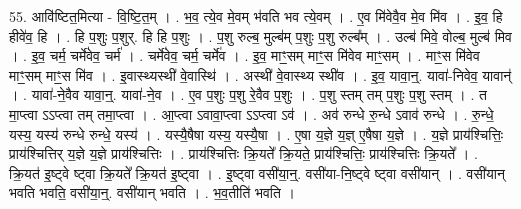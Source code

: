 \documentclass[17pt]{extarticle}
\begin{document}
55. आवि॑ष्टित॒मित्या - वि॒ष्टि॒त॒म् । . भ॒व॒ त्ये॒व मे॒वम् भ॑वति भव त्ये॒वम् । . ए॒व मि॑वेवै॒व मे॒व मि॑व । . इ॒व॒ हि हीवे॑व॒ हि । . हि प॒शुः प॒शुर्. हि हि प॒शुः । . प॒शु रुल्ब॒ मुल्ब॑म् प॒शुः प॒शु रुल्ब᳚म् । . उल्ब॑ मिवे॒ वोल्ब॒ मुल्ब॑ मिव । . इ॒व॒ चर्म॒ चर्मे॑वेव॒ चर्म॑ । . चर्मे॑वेव॒ चर्म॒ चर्मे॑व । . इ॒व॒ माꣳ॒॒सम् माꣳ॒॒स मि॑वेव माꣳ॒॒सम् । . माꣳ॒॒स मि॑वेव माꣳ॒॒सम् माꣳ॒॒स मि॑व । . इ॒वास्थ्यस्थी॑ वे॒वास्थि॑ । . अस्थी॑ वे॒वास्थ्य स्थी॑व । . इ॒व॒ यावा॒न्॒. यावा॑-निवेव॒ यावान्॑ । . यावा॑-ने॒वैव यावा॒न्॒. यावा॑-ने॒व । . ए॒व प॒शुः प॒शु रे॒वैव प॒शुः । . प॒शु स्तम् तम् प॒शुः प॒शु स्तम् । . त मा॒प्त्वा ऽऽप्त्वा तम् तमा॒प्त्वा । . आ॒प्त्वा ऽवावा॒प्त्वा ऽऽप्त्वा ऽव॑ । . अव॑ रुन्धे रु॒न्धे ऽवाव॑ रुन्धे । . रु॒न्धे॒ यस्य॒ यस्य॑ रुन्धे रुन्धे॒ यस्य॑ । . यस्यै॒षैषा यस्य॒ यस्यै॒षा । . ए॒षा य॒ज्ञे य॒ज्ञ् ए॒षैषा य॒ज्ञे । . य॒ज्ञे प्राय॑श्चित्तिः॒ प्राय॑श्चित्तिर् य॒ज्ञे य॒ज्ञे प्राय॑श्चित्तिः । . प्राय॑श्चित्तिः क्रि॒यते᳚ क्रि॒यते॒ प्राय॑श्चित्तिः॒ प्राय॑श्चित्तिः क्रि॒यते᳚ । . क्रि॒यत॑ इ॒ष्ट्वे ष्ट्वा क्रि॒यते᳚ क्रि॒यत॑ इ॒ष्ट्वा । . इ॒ष्ट्वा वसी॑या॒न्॒. वसी॑या-नि॒ष्ट्वे ष्ट्वा वसी॑यान् । . वसी॑यान् भवति भवति॒ वसी॑या॒न्॒. वसी॑यान् भवति । . भ॒व॒तीति॑ भवति । \newline
\end{document}
